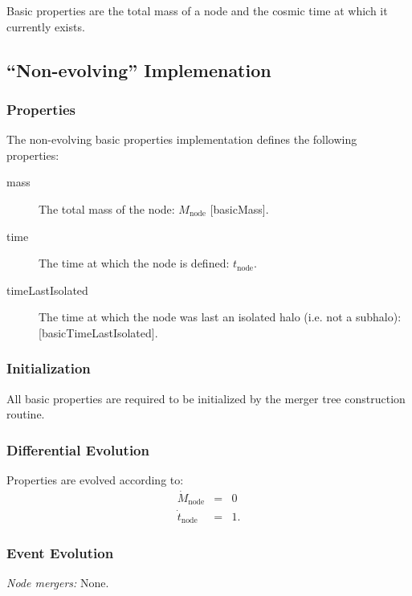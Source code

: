 Basic properties are the total mass of a \gls{node} and the cosmic time at which it currently exists.

\subsection{``Non-evolving'' Implemenation}

\subsubsection{Properties}

The non-evolving basic properties implementation defines the following properties:
\begin{description}
 \item [{\normalfont \ttfamily mass}] The total mass of the node: $M_\mathrm{node}$ [{\normalfont \ttfamily basicMass}].
 \item [{\normalfont \ttfamily time}] The time at which the \gls{node} is defined: $t_\mathrm{node}$.
 \item [{\normalfont \ttfamily timeLastIsolated}] The time at which the \gls{node} was last an isolated halo (i.e. not a subhalo): [\normalfont \ttfamily basicTimeLastIsolated].
\end{description}

\subsubsection{Initialization}

All basic properties are required to be initialized by the merger tree construction routine.

\subsubsection{Differential Evolution}

Properties are evolved according to:
\begin{eqnarray}
 \dot{M}_\mathrm{node} &=& 0 \\
 \dot{t}_\mathrm{node} &=& 1.
\end{eqnarray}

\subsubsection{Event Evolution}

\noindent\emph{Node mergers:} None.\\

